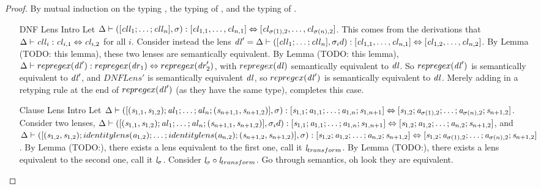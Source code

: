 \dnfls*
\begin{proof}
By mutual induction on the typing \DNFLens{}, the typing of \ClauseLens{}, and the typing of \AtomLens{}.
\begin{enumerate}
\item[DNF Lens Intro] Let $\Delta \vdash ([\mathit{cll}_1 ; \ldots ; \mathit{cll}_n],\sigma) : [\mathit{cl}_{1,1}, \ldots, \mathit{cl}_{n,1}] \Leftrightarrow [\mathit{cl}_{\sigma(1),2}, \ldots, \mathit{cl}_{\sigma(n),2}]$.
This comes from the derivations that $\Delta \vdash \mathit{cll}_i : \mathit{cl}_{i,1} \Leftrightarrow \mathit{cl}_{i,2}$ for all $i$.
Consider instead the lens $\mathit{dl}' = \Delta \vdash ([\mathit{cll}_1 ; \ldots ; \mathit{cll}_n],\sigma_id) : [\mathit{cl}_{1,1}, \ldots, \mathit{cl}_{n,1}] \Leftrightarrow[\mathit{cl}_{1,2}, \ldots, \mathit{cl}_{n,2}]$.
By Lemma (TODO: this lemma), these two lenses are semantically equivalent.
By Lemma (TODO: this lemma), $\Delta \vdash repregex(\mathit{dl}') : repregex(\mathit{dr}_1) \Leftrightarrow repregex(\mathit{dr}_2')$, with $repregex(\mathit{dl})$ semantically equivalent to $\mathit{dl}$.
So $repregex(\mathit{dl}')$ is semantically equivalent to $\mathit{dl}'$, and $DNFLens'$ is semantically equivalent $\mathit{dl}$, so $repregex(\mathit{dl}')$ is
semantically equivalent to $\mathit{dl}$.  Merely adding in a retyping rule at
the end of $repregex(\mathit{dl}')$ (as they have the same type), completes this case.
\item[Clause Lens Intro] Let $\Delta \vdash ([(\mathit{s}_{1,1},\mathit{s}_{1,2}) ; \mathit{al}_1 ; \ldots ; \mathit{al}_n ; (\mathit{s}_{n+1,1},\mathit{s}_{n+1,2})],\sigma) : [\mathit{s}_{1,1};\mathit{a}_{1,1}; \ldots ; \mathit{a}_{1,n} ; \mathit{s}_{1,n+1}] \Leftrightarrow [\mathit{s}_{1,2};\mathit{a}_{\sigma(1),2}; \ldots ; \mathit{a}_{\sigma(n),2} ; \mathit{s}_{n+1,2}]$.
Consider two lenses, $\Delta \vdash ([(\mathit{s}_{1,1},\mathit{s}_{1,2}) ; \mathit{al}_1 ; \ldots ; \mathit{al}_n ; (\mathit{s}_{n+1,1},\mathit{s}_{n+1,2})],\sigma_id) : [\mathit{s}_{1,1};\mathit{a}_{1,1}; \ldots ; \mathit{a}_{1,n} ; \mathit{s}_{1,n+1}] \Leftrightarrow [\mathit{s}_{1,2};\mathit{a}_{1,2}; \ldots ; \mathit{a}_{n,2} ; \mathit{s}_{n+1,2}]$,
and $\Delta \vdash ([(\mathit{s}_{1,2},\mathit{s}_{1,2});identitylens(\mathit{a}_{1,2}); \ldots ; identitylens(\mathit{a}_{n,2}) ; (\mathit{s}_{n+1,2},\mathit{s}_{n+1,2})],\sigma) : [\mathit{s}_{1,2};\mathit{a}_{1,2}; \ldots ; \mathit{a}_{n,2} ; \mathit{s}_{n+1,2}] \Leftrightarrow [\mathit{s}_{1,2};\mathit{a}_{\sigma(1),2}; \ldots ; \mathit{a}_{\sigma(n),2} ; \mathit{s}_{n+1,2}]$.
By Lemma (TODO:), there exists a lens equivalent to the first one, call it $\mathit{l}_{transform}$.
By Lemma (TODO:), there exists a lens equivalent to the second one, call it $\mathit{l}_{\sigma}$.
Consider $\mathit{l}_{\sigma} \circ \mathit{l}_{transform}$.  Go through semantics, oh look they are equivalent.

\end{enumerate}
\end{proof}

